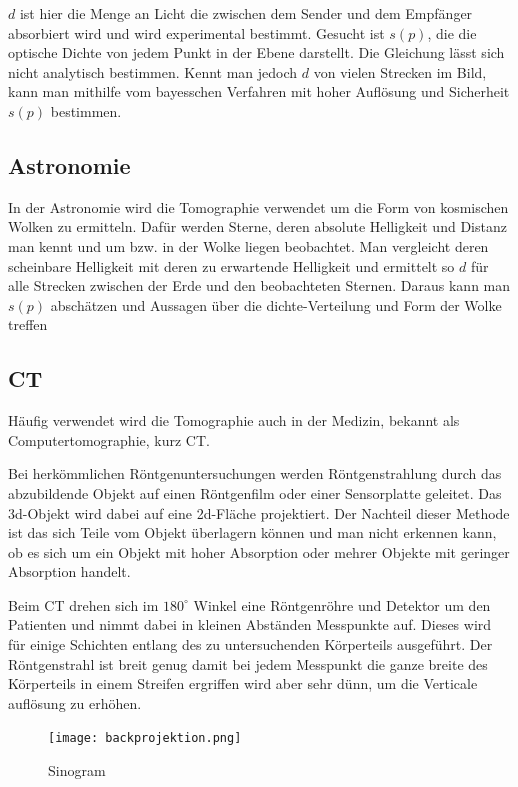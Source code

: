 \documentclass[]{dsadokumentation}
\begin{document}
$d$ ist hier die Menge an Licht die zwischen dem Sender und dem Empfänger absorbiert wird und wird experimental bestimmt. Gesucht ist $s(p)$, die die optische Dichte von jedem Punkt in der Ebene darstellt. Die Gleichung lässt sich nicht analytisch bestimmen. Kennt man jedoch $d$ von vielen Strecken im Bild, kann man mithilfe vom bayesschen Verfahren mit hoher Auflösung und Sicherheit $s(p)$ bestimmen.

\subsection{Astronomie}

In der Astronomie wird die Tomographie verwendet um die Form von kosmischen Wolken zu ermitteln. Dafür werden Sterne, deren absolute Helligkeit und Distanz man kennt und um bzw. in der Wolke liegen beobachtet. Man vergleicht deren scheinbare Helligkeit mit deren zu erwartende Helligkeit und ermittelt so $d$ für alle Strecken zwischen der Erde und den beobachteten Sternen. Daraus kann man $s(p)$ abschätzen und Aussagen über die dichte-Verteilung und Form der Wolke treffen

\subsection{CT}

Häufig verwendet wird die Tomographie auch in der Medizin, bekannt als Computertomographie, kurz CT.

Bei herkömmlichen Röntgenuntersuchungen werden Röntgenstrahlung durch das abzubildende Objekt auf einen Röntgenfilm oder einer Sensorplatte geleitet. Das 3d-Objekt wird dabei auf eine 2d-Fläche projektiert. Der Nachteil dieser Methode ist das sich Teile vom Objekt überlagern können und man nicht erkennen kann, ob es sich um ein Objekt mit hoher Absorption oder mehrer Objekte mit geringer Absorption handelt.

Beim CT drehen sich im $180^\circ$ Winkel eine Röntgenröhre und Detektor um den Patienten und nimmt dabei in kleinen Abständen Messpunkte auf. Dieses wird für einige Schichten entlang des zu untersuchenden Körperteils ausgeführt. Der Röntgenstrahl ist breit genug damit bei jedem Messpunkt die ganze breite des Körperteils in einem Streifen ergriffen wird aber sehr dünn, um die Verticale auflösung zu erhöhen.

\begin{figure}

\texttt{[image: backprojektion.png]}

\caption{Sinogram}

\end{figure}
\end{document}
